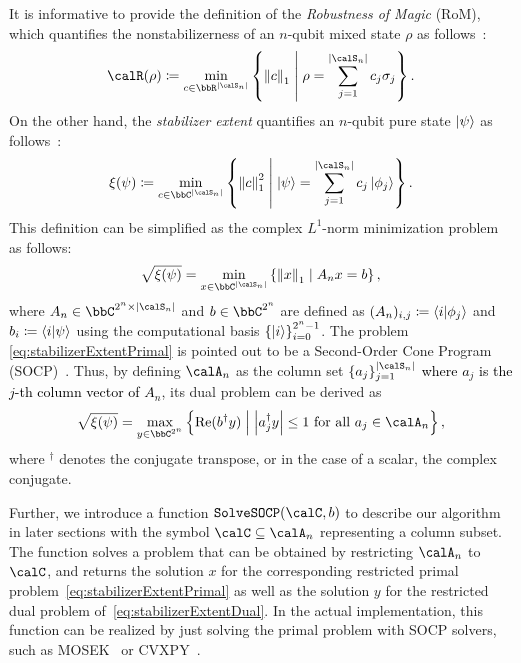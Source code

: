 \documentclass[aps,prx,onecolumn,superscriptaddress,nobibnotes,nofootinbib]{revtex4-2}
\newcommand{\black}[1]{\textcolor{black}{#1}}
\newcommand{\defeq}{\coloneqq}
\newcommand{\relmiddle}[1]{\mathrel{}\middle#1\mathrel{}}
\begin{document}
It is informative to provide the definition of the \textit{Robustness of Magic} (RoM), which quantifies the nonstabilizerness of an $n$-qubit mixed state $\rho$ as follows~\cite{PhysRevLett.118.090501}:
\begin{equation*}
  \calR(\rho) \defeq \min_{c \in \bbR^{\abs{\calS_n}}}
  \left\{ \norm{c}_1 \relmiddle| \rho = \sum_{j=1}^{\abs{\calS_n}} c_j \sigma_j \right\}.
\end{equation*}
On the other hand, the \textit{stabilizer extent} quantifies an $n$-qubit pure state $\ket{\psi}$ as follows~\cite[Definition 3]{Bravyi2019simulationofquantum}:
\begin{equation}\label{eq:stabilizerExtentPrimalOrig}
  \xi(\psi) \defeq \min_{c\in \bbC^{\abs{\calS_n}}}
  \left\{ \norm{c}_1^2 \relmiddle| \ket{\psi} = \sum_{j=1}^{\abs{\calS_n}} c_j \ket{\phi_j} \right\}.
\end{equation}
This definition can be simplified as the complex $L^1$-norm minimization problem as follows:
\begin{equation}\label{eq:stabilizerExtentPrimal}
  \sqrt{\xi(\psi)} = \min_{x \in \bbC^{\abs{\calS_n}}}
  \left\{ \norm{x}_1 \relmiddle| A_n x = b \right\},
\end{equation}
where $A_n \in \bbC^{2^n \times \abs{\calS_n}}$ and $b \in \bbC^{2^n}$ are defined as $(A_n)_{i,j} \defeq \braket{i}{\phi_j}$ and $b_i \defeq \braket{i}{\psi}$ using the computational basis $\qty{\ket{i}}_{i=0}^{2^n-1}$.
The problem \eqref{eq:stabilizerExtentPrimal} is pointed out to be a Second-Order Cone Program (SOCP)~\cite{heimendahlStabilizerExtentNot2021}. Thus, by defining $\calA_n$ as the column set $\{a_j\}_{j=1}^{\abs{\calS_n}}$ \black{where $a_j$ is the $j$-th column vector of $A_n$}, its dual problem can be derived as~\cite[Appendix A]{heimendahlStabilizerExtentNot2021}\cite[Section 5.1.6]{boydConvexOptimization2004}
\begin{equation}\label{eq:stabilizerExtentDual}
  \sqrt{\xi(\psi)} = \max_{y \in \bbC^{2^n}} \left\{ \Re(b^\dagger y) \relmiddle| \abs{a_j^\dagger y} \leq 1
  \text{ for all $a_j \in \calA_n$} \right\},
\end{equation}
where ${}^\dagger$ denotes the conjugate transpose, or in the case of a scalar, the complex conjugate.

Further, we introduce a function $\texttt{SolveSOCP}(\calC, b)$ to describe our algorithm in later sections with the symbol $\calC \subseteq \calA_n$ representing a column subset.
The function solves a problem that can be obtained by restricting $\calA_n$ to $\calC$, and returns the solution $x$ for the corresponding restricted primal problem~\eqref{eq:stabilizerExtentPrimal} as well as the solution $y$ for the restricted dual problem of~\eqref{eq:stabilizerExtentDual}.
In the actual implementation, this function can be realized by just solving the primal problem with SOCP solvers, such as MOSEK~\cite{mosek} or CVXPY~\cite{10.5555/2946645.3007036,agrawal2018rewriting}.
\end{document}
